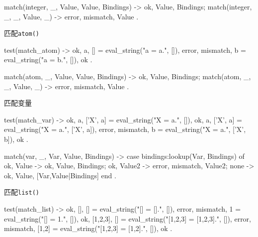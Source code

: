 \documentclass[preview,multi,crop=false,border=1in,class=memoir]{standalone}
\begin{document}
\begin{preview-page}
\begin{SourceCode}
match({integer, _, Value}, Value, Bindings) ->
    {ok, Value, Bindings};
match({integer, _, _}, Value, _) ->
    {error, {mismatch, Value}}
.
\end{SourceCode}


匹配\verb|atom()|

\begin{SourceCode}
test(match_atom) ->
    {ok, a, []} = eval_string("a = a.", []),
    {error, {mismatch, b}} = eval_string("a = b.", []),
    ok
.
\end{SourceCode}


\begin{SourceCode}
match({atom, _, Value}, Value, Bindings) ->
    {ok, Value, Bindings};
match({atom, _, _}, Value, _) ->
    {error, {mismatch, Value}}
.
\end{SourceCode}


匹配变量

\begin{SourceCode}
test(match_var) ->
    {ok, a, [{'X', a}]} = eval_string("X = a.", []),
    {ok, a, [{'X', a}]} = eval_string("X = a.", [{'X', a}]),
    {error, {mismatch, b}} = eval_string("X = a.", [{'X', b}]),
    ok
.
\end{SourceCode}


\begin{SourceCode}
match({var, _, Var}, Value, Bindings) ->
    case bindings:lookup(Var, Bindings) of
        {ok, Value} ->
            {ok, Value, Bindings};
        {ok, Value2} ->
            {error, {mismatch, Value2}};
        none ->
            {ok, Value, [{Var,Value}|Bindings]}
    end
.
\end{SourceCode}

匹配\verb|list()|

\begin{SourceCode}
test(match_list) ->
    {ok, [], []} = eval_string("[] = [].", []),
    {error, {mismatch, 1}} = eval_string("[] = 1.", []),
    {ok, [1,2,3], []} = eval_string("[1,2,3] = [1,2,3].", []),
    {error, {mismatch, [1,2]}} = eval_string("[1,2,3] = [1,2].", []),
    ok
.
\end{SourceCode}



\end{preview-page}
\end{document}
